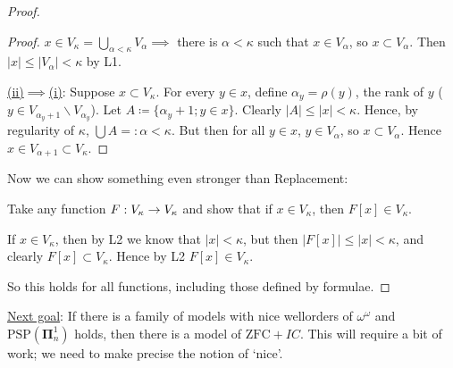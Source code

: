 \documentclass[]{article}
\newcommand{\om}{\omega}
\newcommand{\bopi}{\bm{\Pi}}
\newcommand{\psp}{\textrm{PSP}}
\newcommand{\zfc}{\textrm{ZFC}}
\begin{document}
\begin{enumerate}[label = (\roman*)]
\begin{proof}
\begin{proof}
            $x \in V_\kappa = \bigcup_{\alpha < \kappa}V_\alpha \implies $ there is $\alpha < \kappa$ such that $x \in V_\alpha$, so $x \subset V_\alpha$. Then $|x| \le |V_\alpha| < \kappa$ by L1.

            \underline{(ii)$\implies$(i)}: Suppose $x\subset V_\kappa$. For every $y \in x$, define $\alpha_y = \rho(y)$, the rank of $y$ ($y \in V_{\alpha_y+1}\backslash V_{\alpha_y}$). Let $A\coloneqq \{\alpha_y+1; y \in x\}$. Clearly $|A| \le |x| < \kappa$. Hence, by regularity of $\kappa$, $\bigcup A =:\alpha < \kappa$. But then for all $y \in x$, $y \in V_\alpha$, so $x \subset V_\alpha$. Hence $x \in V_{\alpha+1}\subset V_\kappa$.
        \end{proof}

        Now we can show something even stronger than Replacement:

        Take any function $F: V_\kappa \rightarrow V_\kappa$ and show that if $x \in V_\kappa$, then $F[x] \in V_\kappa$.

        If $x \in V_\kappa$, then by L2 we know that $|x| <\kappa$, but then $|F[x]|\le |x| < \kappa$, and clearly $F[x]\subset V_\kappa$. Hence by L2 $F[x] \in V_\kappa$.

        So this holds for all functions, including those defined by formulae.
    \end{proof}
\end{enumerate}

\underline{Next goal}: If there is a family of models with nice wellorders of $\om^\om$ and $\psp(\bopi^1_n)$ holds, then there is a model of $\zfc + IC$. This will require a bit of work; we need to make precise the notion of `nice'.
\end{document}

